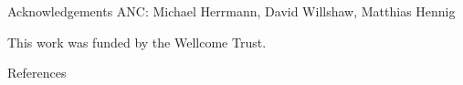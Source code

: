 \documentclass[final,hyperref={pdfpagelabels=false}]{beamer}
\begin{document}
\begin{frame}{}
\begin{columns}[T]
\begin{column}{.33\linewidth}
\begin{block}{Acknowledgements}
        ANC: Michael Herrmann, David Willshaw, Matthias Hennig

        This work was funded by the Wellcome Trust.
      \end{block}


      \begin{block}{References}
        \footnotesize
        
        
      \end{block}
    \end{column}


  \end{columns}



\end{frame}
\end{document}
